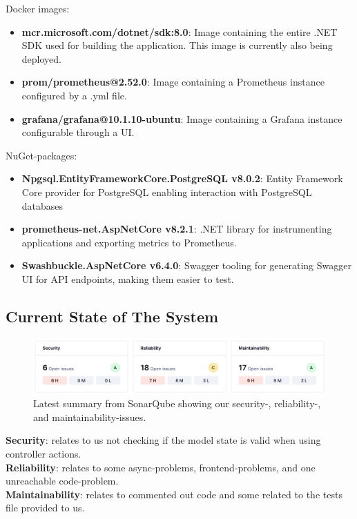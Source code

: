 Docker images:
\begin{itemize}
    \item \textbf{mcr.microsoft.com/dotnet/sdk:8.0}: Image containing the entire .NET SDK used for building the application. This image is currently also being deployed.
    \item \textbf{prom/prometheus@2.52.0}: Image containing a Prometheus instance configured by a .yml file.
    \item \textbf{grafana/grafana@10.1.10-ubuntu}: Image containing a Grafana instance configurable through a UI.
\end{itemize}

NuGet-packages:
\begin{itemize}
    \item \textbf{Npgsql.EntityFrameworkCore.PostgreSQL v8.0.2}: Entity Framework Core provider for PostgreSQL enabling interaction with PostgreSQL databases
    \item \textbf{prometheus-net.AspNetCore v8.2.1}: .NET library for instrumenting applications and exporting metrics to Prometheus.
    \item \textbf{Swashbuckle.AspNetCore v6.4.0}: Swagger tooling for generating Swagger UI for API endpoints, making them easier to test.
\end{itemize}


\subsection{Current State of The System}

\begin{figure}[H]
  \centering
  \includegraphics[width=\textwidth]{Images/sonarqube_stats.png}
  \caption{Latest summary from SonarQube showing our security-, reliability-, and maintainability-issues.}
  \label{fig:sonarqube_stats}
\end{figure}

\textbf{Security}: relates to us not checking if the model state is valid when using controller actions. \\
\textbf{Reliability}: relates to some async-problems, frontend-problems, and one unreachable code-problem. \\
\textbf{Maintainability}: relates to commented out code and some related to the tests file provided to us.

